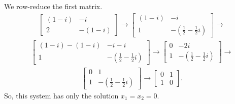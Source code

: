 \documentclass[12pt]{article}
\begin{document}
\begin{enumerate}
      We row-reduce the first matrix.
      \begin{align*}
        \begin{bmatrix}
          (1 - i) & -i \\
          2       & -(1 - i)
        \end{bmatrix}
        \xrightarrow{}
        \begin{bmatrix}
          (1 - i) & -i \\
          1       & -(\frac{1}{2} - \frac{1}{2}i)
        \end{bmatrix}
        \xrightarrow{}
      \end{align*}
      \begin{align*}
        \begin{bmatrix}
          (1 - i) - (1 - i) & -i -i \\
          1       & -(\frac{1}{2} - \frac{1}{2}i)
        \end{bmatrix}
        \xrightarrow{}
        \begin{bmatrix}
          0 & -2i \\
          1 & -(\frac{1}{2} - \frac{1}{2}i)
        \end{bmatrix}
        \xrightarrow{}
      \end{align*}
      \begin{align*}
        \begin{bmatrix}
          0 & 1 \\
          1 & -(\frac{1}{2} - \frac{1}{2}i)
        \end{bmatrix}
        \xrightarrow{}
        \begin{bmatrix}
          0 & 1 \\
          1 & 0
        \end{bmatrix}.
      \end{align*}
      So, this system has only the solution $x_1 = x_2 = 0$.


\end{enumerate}
\end{document}
